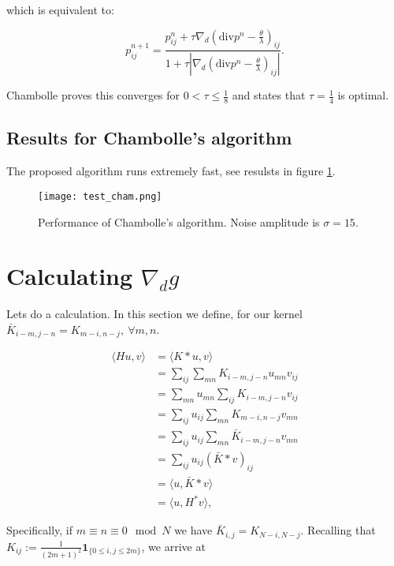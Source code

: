 \documentclass[paper=a4, fontsize=11pt]{scrartcl} %
\numberwithin{equation}{section} %
\numberwithin{figure}{section} %
\numberwithin{table}{section} %
\newcommand{\grad}{\nabla_{d} }
\newcommand{\divg}{\text{div}}
\begin{document}
which is equivalent to:

\begin{equation}
p_{ij}^{n+1} = \frac{p_{ij}^{n} + \tau \grad (\divg p^{n} - \frac{\theta}{\lambda})_{ij}}
{1+ \tau | \grad (\divg p^{n} - \frac{\theta}{\lambda})_{ij}|}.
\end{equation}

Chambolle \cite{chambolle2004algorithm} proves this converges for $0 <
\tau \leq \frac{1}{8}$ and states that $\tau = \frac{1}{4}$ is
optimal.

\subsection{Results for Chambolle's algorithm}
The proposed algorithm runs extremely fast, see resulsts in figure
\ref{cham}.

\begin{figure}[ht!]
\centering
\texttt{[image: test\_cham.png]}
\caption{Performance of Chambolle's algorithm. Noise amplitude is $\sigma = 15$. \label{cham}}
\end{figure}



\section{Calculating $\grad g$}
Lets do a calculation. In this section we define, for our kernel 
 $\bar{K}_{i-m,j-n} =  K_{m-i,n-j}, \ \forall m,n$.

\begin{align*}
  \langle Hu,v \rangle &= \langle K * u, v \rangle\\
  &= \sum_{ij} \sum_{mn} K_{i-m,j-n}u_{mn} v_{ij} \\
  &= \sum_{mn} u_{mn} \sum_{ij} K_{i-m,j-n} v_{ij} \\
  &= \sum_{ij} u_{ij} \sum_{mn} K_{m-i,n-j} v_{mn} \\
  &= \sum_{ij} u_{ij} \sum_{mn} \bar{K}_{i-m,j-n} v_{mn} \\
  &= \sum_{ij} u_{ij} (\bar{K} * v)_{ij} \\
  &= \langle u , \bar{K} *v \rangle \\
  &= \langle u, H^{*} v \rangle,
\end{align*}

Specifically, if $m \equiv n \equiv 0 \mod N$ we have $\bar{K}_{i,j} =
K_{N-i,N-j}$. Recalling that $K_{ij} := \frac{1}{ (2m+1)^2 }
\mathbf{1}_{\{ 0 \leq i,j \leq 2m \} }$, we arrive at
\end{document}
